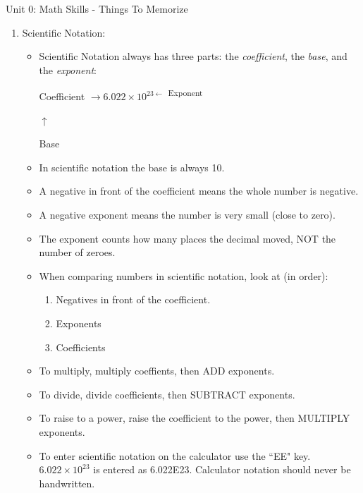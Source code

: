 \documentclass[letterpaper, 12pt]{article}
\newcommand{\assnum}{Unit 0: Math Skills}
\newcommand{\assname}{Things To Memorize}
\begin{document}
\fancyfoot[r]{\assnum}	


\begin{center} \assnum{} - \assname{}
\end{center}





\begin{enumerate}
	\item Scientific Notation:
		\begin{itemize}
			\item Scientific Notation always has three parts: the \textit{coefficient}, the \textit{base}, and the \textit{exponent}:
			\begin{center}
				Coefficient $\rightarrow 6.022 \times 10^{23 \leftarrow}$ \textsuperscript{Exponent}
				
				\hspace{.7in} $\uparrow$
				
				\hspace{.7in} Base
			\end{center}
		\item In scientific notation the base is always 10.
		\item A negative in front of the coefficient means the whole number is negative.
		\item A negative exponent means the number is very small (close to zero).
		\item The exponent counts how many places the decimal moved, NOT the number of zeroes.	
		\item When comparing numbers in scientific notation, look at (in order): 
		\begin{enumerate}
			\item Negatives in front of the coefficient.
			\item Exponents
			\item Coefficients
		\end{enumerate}
	
	\item To multiply, multiply coeffients, then ADD exponents.
	\item To divide, divide coefficients, then SUBTRACT exponents.
	\item To raise to a power, raise the coefficient to the power, then MULTIPLY exponents.
	\item To enter scientific notation on the calculator use the ``EE" key. $6.022 \times 10^{23}$ is entered as 6.022\scriptsize E\normalsize23.  Calculator notation should never be handwritten. 
	\end{itemize}
	

\end{enumerate}
\end{document}
